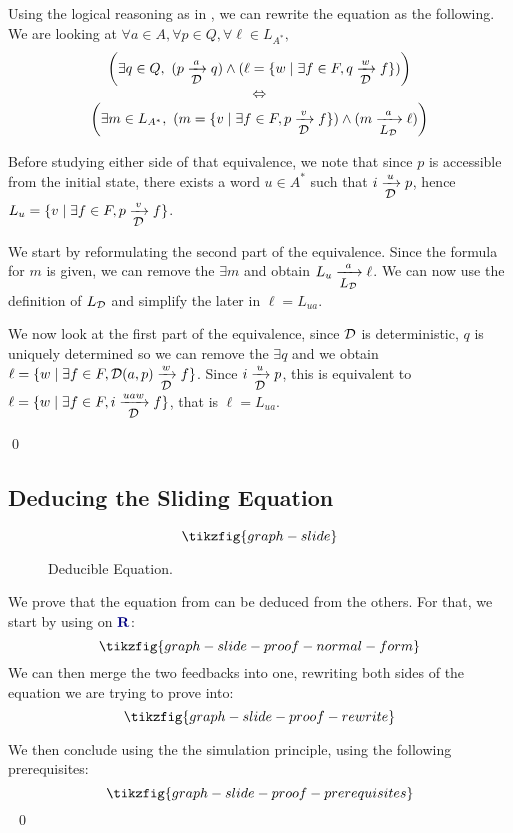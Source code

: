 	Using the logical reasoning as in , we can rewrite the equation as the following. We are looking at $\forall a \in A, \forall p \in Q, \forall \ell \in L_{A^*},$
	\[ \begin{array}{c} \left(\exists q\in Q,~  (p \xrightarrow[\text{\small${\mathcal{D}}$}]{a} q)\land (\ell = \{ w \mid \exists f \in F, q \xrightarrow[\text{\small${\mathcal{D}}$}]{w} f\}) \right) \\ \Leftrightarrow \\ \left(\exists m \in L_{A^*},~  (m = \{ v \mid \exists f \in F, p \xrightarrow[\text{\small${\mathcal{D}}$}]{v} f\}) \land (m \xrightarrow[\text{\small$L_{\mathcal{D}}$}]{a} \ell)\right) \end{array} \]

	Before studying either side of that equivalence, we note that since $p$ is accessible from the initial state, there exists a word $u \in A^*$ such that $i \xrightarrow[\text{\small${\mathcal{D}}$}]{u} p$, hence $L_u = \{ v \mid \exists f \in F, p \xrightarrow[\text{\small${\mathcal{D}}$}]{v} f\}$.

	We start by reformulating the second part of the equivalence.  Since the formula for $m$ is given, we can remove the $\exists m$ and obtain $L_u \xrightarrow[\text{\small$L_{\mathcal{D}}$}]{a} \ell$. We can now use the definition of $L_{\mathcal{D}}$ and simplify the later in $\ell = L_{ua}$.

	We now look at the first part of the equivalence, since ${\mathcal{D}}$ is deterministic, $q$ is uniquely determined so we can remove the $\exists q$ and we obtain $\ell = \{ w \mid \exists f \in F, {\mathcal{D}}(a,p) \xrightarrow[\text{\small${\mathcal{D}}$}]{w} f\}$. Since  $i \xrightarrow[\text{\small${\mathcal{D}}$}]{u} p$, this is equivalent to $\ell = \{ w \mid \exists f \in F, i \xrightarrow[\text{\small${\mathcal{D}}$}]{uaw} f\}$, that is $\ell = L_{ua}$.

	\qed




\subsection{Deducing the Sliding Equation}\label{app:fin-slide}

\begin{figure*}
	\[\tikzfig{graph-slide}\]
	\caption{Deducible Equation.}
	\label{appfig:graph-slide}
\end{figure*}

We prove that the equation from  can be deduced from the others. For that, we start by using  on $\bR$:
\[\tikzfig{graph-slide-proof-normal-form}\]
We can then merge the two feedbacks into one, rewriting both sides of the equation we are trying to prove into:
\[\tikzfig{graph-slide-proof-rewrite}\]

We then conclude using the the simulation principle, using the following prerequisites:
\[\tikzfig{graph-slide-proof-prerequisites}\]
~\qed


